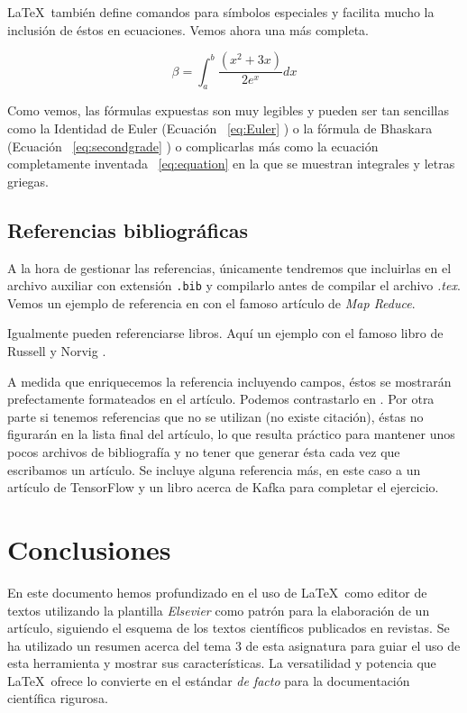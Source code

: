 \documentclass[review]{elsarticle}
\begin{document}
\LaTeX\ también define comandos para símbolos especiales y facilita mucho la inclusión de éstos en ecuaciones. Vemos ahora una más completa.


\begin{equation} \label{eq:equation} 
  \beta = \int_{a}^{b}{\frac{(x^2 + 3x)}{2e^x}dx}
\end{equation}

Como vemos, las fórmulas expuestas son muy legibles y pueden ser tan sencillas como la Identidad de Euler (Ecuación ~\ref{eq:Euler} ) o la fórmula de Bhaskara (Ecuación ~\ref{eq:secondgrade} ) o complicarlas más como la ecuación completamente inventada ~\ref{eq:equation} en la que se muestran integrales y letras griegas. 


\subsection{Referencias bibliográficas}

A la hora de gestionar las referencias, únicamente tendremos que incluirlas en el archivo auxiliar con extensión \texttt{.bib} y compilarlo antes de compilar el archivo \textit{.tex}. Vemos un ejemplo de referencia en \cite{Dean:2004:MSD:1251254.1251264} con el famoso artículo de \textit{Map Reduce}.

Igualmente pueden referenciarse libros. Aquí un ejemplo con el famoso libro de Russell y Norvig \cite{Russell:2003:AIM:773294}.

A medida que enriquecemos la referencia incluyendo campos, éstos se mostrarán prefectamente formateados en el artículo. Podemos contrastarlo en \cite{Groman:1996:ESH:381984.381988}. Por otra parte si tenemos referencias que no se utilizan (no existe citación), éstas no figurarán en la lista final del artículo, lo que resulta práctico para mantener unos pocos archivos de bibliografía y no tener que generar ésta cada vez que escribamos un artículo. 
Se incluye alguna referencia más, en este caso a un artículo de TensorFlow \cite{tensorflow2015-whitepaper} y un libro acerca de Kafka \cite{Narkhede:2017:KDG:3175825} para completar el ejercicio.

\section{Conclusiones}

En este documento hemos profundizado en el uso de \LaTeX\ como editor de textos utilizando la plantilla \textit{Elsevier} como patrón para la elaboración de un artículo, siguiendo el esquema de los textos científicos publicados en revistas. Se ha utilizado un resumen acerca del tema 3 de esta asignatura para guiar el uso de esta herramienta y mostrar sus características.  La versatilidad y potencia que \LaTeX\ ofrece lo convierte en el estándar \textit{de facto} para la documentación científica rigurosa. 

\section*{}


\end{document}

